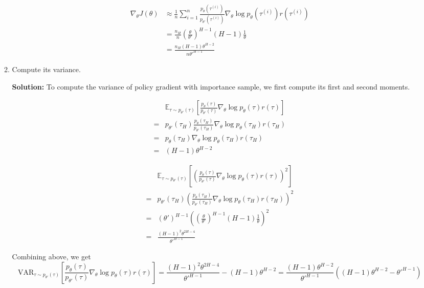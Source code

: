 \documentclass{article}
\begin{document}
\begin{enumerate}
\begin{enumerate}
\begin{align}
\nabla_\theta J(\theta) &\approx \frac{1}{n} \sum_{i=1}^{n} \frac{p_\theta(\tau^{(i)})}{p_{\theta'}(\tau^{(i)})} \nabla_\theta \log p_\theta(\tau^{(i)}) r(\tau^{(i)}) \\
&= \frac{n_H}{n}(\frac{\theta}{\theta'})^{H-1}(H-1)\frac{1}{\theta} \\
&= \frac{n_H(H-1)\theta^{H-2}}{n{\theta'}^{H-1}}
\end{align}
    \item Compute its variance.

\textbf{Solution:} To compute the variance of policy gradient with importance sample, we first compute its first and second moments.

\begin{align}
&\mathbb{E}_{\tau \sim p_{\theta'}(\tau)}\left[\frac{p_\theta(\tau)}{p_{\theta'}(\tau)}\nabla_\theta \log p_\theta(\tau) r(\tau)\right] \\
=& p_{\theta'}(\tau_H) \frac{p_\theta(\tau_H)}{p_{\theta'}(\tau_H)}\nabla_\theta \log p_\theta(\tau_H) r(\tau_H)\\
=& p_\theta(\tau_H)\nabla_\theta \log p_\theta(\tau_H) r(\tau_H) \\
=& (H-1)\theta^{H-2}
\end{align}

\begin{align}
&\mathbb{E}_{\tau \sim p_{\theta'}(\tau)}\left[\left(\frac{p_\theta(\tau)}{p_{\theta'}(\tau)}\nabla_\theta \log p_\theta(\tau) r(\tau)\right)^2\right] \\
=& p_{\theta'}(\tau_H) \left(\frac{p_\theta(\tau_H)}{p_{\theta'}(\tau_H)}\nabla_\theta \log p_\theta(\tau_H) r(\tau_H)\right)^2\\
=& (\theta')^{H-1}\left(\left(\frac{\theta}{\theta'}\right)^{H-1}(H-1)\frac{1}{\theta}\right)^2 \\
=& \frac{(H-1)^2\theta^{2H-4}}{{\theta'}^{H-1}}
\end{align}

Combining above, we get 
\[
\text{VAR}_{\tau \sim p_{\theta'}(\tau)}\left[ \frac{p_\theta(\tau)}{p_{\theta'}(\tau)}\nabla_\theta \log p_\theta(\tau) r(\tau)\right] = \frac{(H-1)^2\theta^{2H-4}}{{\theta'}^{H-1}} - (H-1)\theta^{H-2} = \frac{(H-1)\theta^{H-2}}{{\theta'}^{H-1}}\left( (H-1)\theta^{H-2} - {\theta'}^{H-1}\right)
\]

\end{enumerate}

\end{enumerate}
\end{document}
